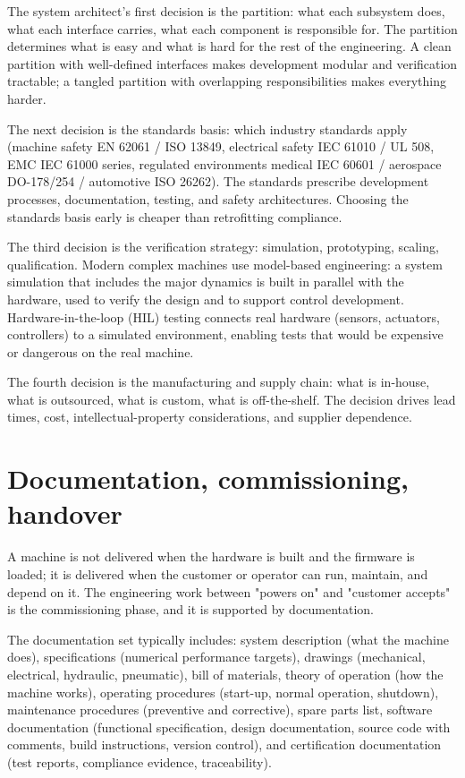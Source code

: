 The system architect's first decision is the partition: what each subsystem does, what each interface carries, what each component is responsible for. The partition determines what is easy and what is hard for the rest of the engineering. A clean partition with well-defined interfaces makes development modular and verification tractable; a tangled partition with overlapping responsibilities makes everything harder.

The next decision is the standards basis: which industry standards apply (machine safety EN 62061 / ISO 13849, electrical safety IEC 61010 / UL 508, EMC IEC 61000 series, regulated environments medical IEC 60601 / aerospace DO-178/254 / automotive ISO 26262). The standards prescribe development processes, documentation, testing, and safety architectures. Choosing the standards basis early is cheaper than retrofitting compliance.

The third decision is the verification strategy: simulation, prototyping, scaling, qualification. Modern complex machines use model-based engineering: a system simulation that includes the major dynamics is built in parallel with the hardware, used to verify the design and to support control development. Hardware-in-the-loop (HIL) testing connects real hardware (sensors, actuators, controllers) to a simulated environment, enabling tests that would be expensive or dangerous on the real machine.

The fourth decision is the manufacturing and supply chain: what is in-house, what is outsourced, what is custom, what is off-the-shelf. The decision drives lead times, cost, intellectual-property considerations, and supplier dependence.

\section{Documentation, commissioning, handover}

A machine is not delivered when the hardware is built and the firmware is loaded; it is delivered when the customer or operator can run, maintain, and depend on it. The engineering work between "powers on" and "customer accepts" is the commissioning phase, and it is supported by documentation.

The documentation set typically includes: system description (what the machine does), specifications (numerical performance targets), drawings (mechanical, electrical, hydraulic, pneumatic), bill of materials, theory of operation (how the machine works), operating procedures (start-up, normal operation, shutdown), maintenance procedures (preventive and corrective), spare parts list, software documentation (functional specification, design documentation, source code with comments, build instructions, version control), and certification documentation (test reports, compliance evidence, traceability).

